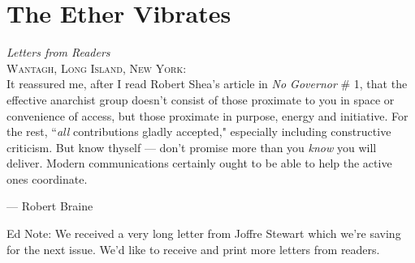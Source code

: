 \chapter{The Ether Vibrates}
\vspace{-1cm}
\emph{Letters from Readers}\\

\noindent \textsc{Wantagh, Long Island, New York:}\\

It reassured me, after I read Robert Shea's article in \emph{No Governor} \# 1, that the effective anarchist group doesn't consist of those proximate to you in space or convenience of access, but those proximate in purpose, energy and initiative. For the rest, ``\emph{all} contributions gladly accepted," especially including constructive criticism. But know thyself --- don't promise more than you \emph{know} you will deliver. Modern communications certainly ought to be able to help the active ones coordinate.
\par\begin{flushright} --- Robert Braine\\ \end{flushright}

\noindent Ed Note: We received a very long letter from Joffre Stewart which we're saving for the next issue. We'd like to receive and print more letters from readers.

